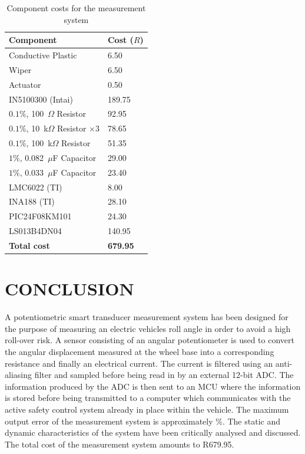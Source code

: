 \documentclass[10pt,twocolumn]{witseiepaper}
\begin{document}
\begin{table}[h!]
	\caption{Component costs for the measurement system} \label{tab:cost}
	\begin{tabular}{|p{}| p{}|}
		\hline
		\textbf{Component } & \textbf{Cost ($R$)} \\ \hline
		Conductive Plastic & 6.50 \\
		Wiper &  6.50 \\
		Actuator & 0.50 \\
		IN5100300 (Intai) & 189.75 \\
		$0.1\%$, 100~$\Omega$ Resistor& 92.95 \\
		$0.1\%$, 10~k$\Omega$ Resistor $\times 3$ & 78.65  \\
		$0.1\%$, 100~k$\Omega$ Resistor & 51.35\\
		$1\%$, 0.082~$\mu$F Capacitor &  29.00 \\
		$1\%$, 0.033~$\mu$F Capacitor &  23.40\\
		LMC6022 (TI) & 8.00 \\
		INA188 (TI)&  28.10 \\
		PIC24F08KM101 & 24.30 \\
		LS013B4DN04 & 140.95 \\ \hline
		\textbf{Total cost} &  \textbf{679.95} \\ \hline
	\end{tabular}
\end{table}

\section{CONCLUSION}

A  potentiometric smart transducer measurement system has been designed for the purpose of measuring an electric vehicles roll angle in order to avoid a high roll-over risk. A sensor consisting of an angular potentiometer is used to convert the angular displacement measured at the wheel base into a corresponding resistance and finally an electrical current. The current is filtered using an anti-aliasing filter and sampled before being read in by an external 12-bit ADC. The information produced by the ADC is then sent to an MCU where the information is stored before being transmitted to a computer which communicates with the active safety control system already in place within the vehicle. The maximum output error of the measurement system is approximately \%. The static and dynamic characteristics of the system have been critically analysed and discussed. The total cost of the measurement system amounts to R679.95.
\end{document}
